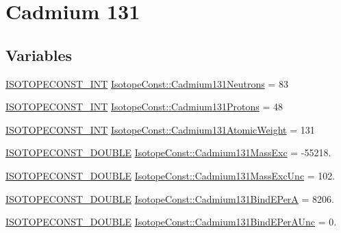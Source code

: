 \hypertarget{group___isotope_const-_cadmium-_cd131}{}\section{Cadmium 131}
\label{group___isotope_const-_cadmium-_cd131}
\subsection*{Variables}
\begin{DoxyCompactItemize}
\item 
\mbox{\hyperlink{group___isotope_const-_macros_ga5f18360b3e99483a35c32d789e62621c}{I\+S\+O\+T\+O\+P\+E\+C\+O\+N\+S\+T\+\_\+\+I\+NT}} \mbox{\hyperlink{group___isotope_const-_cadmium-_cd131_ga63ba37ff1a65a59980b7689ae3b45521}{Isotope\+Const\+::\+Cadmium131\+Neutrons}} = 83
\item 
\mbox{\hyperlink{group___isotope_const-_macros_ga5f18360b3e99483a35c32d789e62621c}{I\+S\+O\+T\+O\+P\+E\+C\+O\+N\+S\+T\+\_\+\+I\+NT}} \mbox{\hyperlink{group___isotope_const-_cadmium-_cd131_ga8992b7f357d3c2e9ec0b6494c8e1e621}{Isotope\+Const\+::\+Cadmium131\+Protons}} = 48
\item 
\mbox{\hyperlink{group___isotope_const-_macros_ga5f18360b3e99483a35c32d789e62621c}{I\+S\+O\+T\+O\+P\+E\+C\+O\+N\+S\+T\+\_\+\+I\+NT}} \mbox{\hyperlink{group___isotope_const-_cadmium-_cd131_ga07798a4c875a1401957f59a539a32e03}{Isotope\+Const\+::\+Cadmium131\+Atomic\+Weight}} = 131
\item 
\mbox{\hyperlink{group___isotope_const-_macros_ga8f45a7272ce02c0b4c65c44636ed719a}{I\+S\+O\+T\+O\+P\+E\+C\+O\+N\+S\+T\+\_\+\+D\+O\+U\+B\+LE}} \mbox{\hyperlink{group___isotope_const-_cadmium-_cd131_ga4db58c0bea992f55368b5bad37296059}{Isotope\+Const\+::\+Cadmium131\+Mass\+Exc}} = -\/55218.
\item 
\mbox{\hyperlink{group___isotope_const-_macros_ga8f45a7272ce02c0b4c65c44636ed719a}{I\+S\+O\+T\+O\+P\+E\+C\+O\+N\+S\+T\+\_\+\+D\+O\+U\+B\+LE}} \mbox{\hyperlink{group___isotope_const-_cadmium-_cd131_ga68e9258c4cf70942b1cde3b75ccdd02d}{Isotope\+Const\+::\+Cadmium131\+Mass\+Exc\+Unc}} = 102.
\item 
\mbox{\hyperlink{group___isotope_const-_macros_ga8f45a7272ce02c0b4c65c44636ed719a}{I\+S\+O\+T\+O\+P\+E\+C\+O\+N\+S\+T\+\_\+\+D\+O\+U\+B\+LE}} \mbox{\hyperlink{group___isotope_const-_cadmium-_cd131_ga6b37bce3c49955a274286eed33753fee}{Isotope\+Const\+::\+Cadmium131\+Bind\+E\+PerA}} = 8206.
\item 
\mbox{\hyperlink{group___isotope_const-_macros_ga8f45a7272ce02c0b4c65c44636ed719a}{I\+S\+O\+T\+O\+P\+E\+C\+O\+N\+S\+T\+\_\+\+D\+O\+U\+B\+LE}} \mbox{\hyperlink{group___isotope_const-_cadmium-_cd131_ga5d1b01329b17edce0129f41fbb02015c}{Isotope\+Const\+::\+Cadmium131\+Bind\+E\+Per\+A\+Unc}} = 0.

\end{DoxyCompactItemize}

